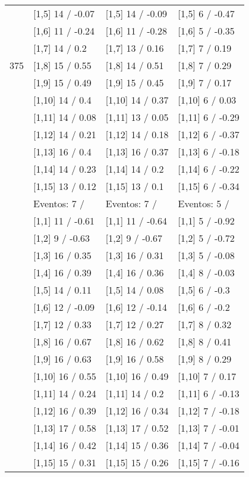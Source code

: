 \begin{table}
\begin{tabular}[t]{llll}
 & {}[1,5] 14  / -0.07 & {}[1,5] 14  / -0.09 & {}[1,5] 6  / -0.47\\
 & {}[1,6] 11  / -0.24 & {}[1,6] 11  / -0.28 & {}[1,6] 5  / -0.35\\
 & {}[1,7] 14  / 0.2 & {}[1,7] 13  / 0.16 & {}[1,7] 7  / 0.19\\
375 & {}[1,8] 15  / 0.55 & {}[1,8] 14  / 0.51 & {}[1,8] 7  / 0.29\\
\addlinespace
 & {}[1,9] 15  / 0.49 & {}[1,9] 15  / 0.45 & {}[1,9] 7  / 0.17\\
 & {}[1,10] 14  / 0.4 & {}[1,10] 14  / 0.37 & {}[1,10] 6  / 0.03\\
 & {}[1,11] 14  / 0.08 & {}[1,11] 13  / 0.05 & {}[1,11] 6  / -0.29\\
 & {}[1,12] 14  / 0.21 & {}[1,12] 14  / 0.18 & {}[1,12] 6  / -0.37\\
 & {}[1,13] 16  / 0.4 & {}[1,13] 16  / 0.37 & {}[1,13] 6  / -0.18\\
\addlinespace
 & {}[1,14] 14  / 0.23 & {}[1,14] 14  / 0.2 & {}[1,14] 6  / -0.22\\
 & {}[1,15] 13  / 0.12 & {}[1,15] 13  / 0.1 & {}[1,15] 6  / -0.34\\
 & Eventos:  7 / & Eventos:  7 / & Eventos:  5 /\\
 & {}[1,1] 11  / -0.61 & {}[1,1] 11  / -0.64 & {}[1,1] 5  / -0.92\\
 & {}[1,2] 9  / -0.63 & {}[1,2] 9  / -0.67 & {}[1,2] 5  / -0.72\\
\addlinespace
 & {}[1,3] 16  / 0.35 & {}[1,3] 16  / 0.31 & {}[1,3] 5  / -0.08\\
 & {}[1,4] 16  / 0.39 & {}[1,4] 16  / 0.36 & {}[1,4] 8  / -0.03\\
 & {}[1,5] 14  / 0.11 & {}[1,5] 14  / 0.08 & {}[1,5] 6  / -0.3\\
 & {}[1,6] 12  / -0.09 & {}[1,6] 12  / -0.14 & {}[1,6] 6  / -0.2\\
 & {}[1,7] 12  / 0.33 & {}[1,7] 12  / 0.27 & {}[1,7] 8  / 0.32\\
\addlinespace
500 & {}[1,8] 16  / 0.67 & {}[1,8] 16  / 0.62 & {}[1,8] 8  / 0.41\\
 & {}[1,9] 16  / 0.63 & {}[1,9] 16  / 0.58 & {}[1,9] 8  / 0.29\\
 & {}[1,10] 16  / 0.55 & {}[1,10] 16  / 0.49 & {}[1,10] 7  / 0.17\\
 & {}[1,11] 14  / 0.24 & {}[1,11] 14  / 0.2 & {}[1,11] 6  / -0.13\\
 & {}[1,12] 16  / 0.39 & {}[1,12] 16  / 0.34 & {}[1,12] 7  / -0.18\\
\addlinespace
 & {}[1,13] 17  / 0.58 & {}[1,13] 17  / 0.52 & {}[1,13] 7  / -0.01\\
 & {}[1,14] 16  / 0.42 & {}[1,14] 15  / 0.36 & {}[1,14] 7  / -0.04\\
 & {}[1,15] 15  / 0.31 & {}[1,15] 15  / 0.26 & {}[1,15] 7  / -0.16\\
\bottomrule
\end{tabular}
\end{table}
